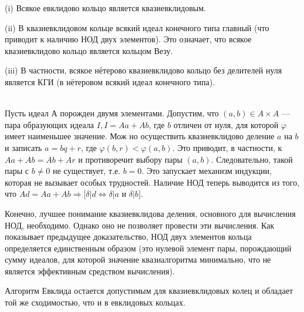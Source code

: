 \documentclass{mai_book}
\begin{document}
\begin{predl}
\hspace*{0.5cm}
(i) Всякое евклидово кольцо является квазиевклидовым.

(ii) В квазиевклидовом кольце всякий идеал конечного типа главный (что приводит к наличию НОД двух элементов). Это означает, что всякое квазиевклидово кольцо является кольцом Везу.

(iii) В частности, всякое нётерово квазиевклидово кольцо без дели­телей нуля является КГИ (в нётеровом всякий идеал конечного типа).
\end{predl}
\begin{myproof}
\\
Пусть идеал $А$ порожден двумя элементами. Допустим, что
$(a, b)\in A \times A$ — пара образующих идеала $I, I = Aa + Ab$, где $b$
отличен от нуля, для которой $\varphi$ имеет наименьшее значение. Мож­
но осуществить квазиевклидово деление $a$ на $b$ и записать $a=bq+r$,
где $\varphi(b,r) < \varphi(a, b)$. Это приводит, в частности, к $Aa+Ab=Ab+Ar$
и противоречит выбору пары $(a,b)$. Следовательно, такой пары с
$b\neq0$ не существует, т.е. $b=0$. Это запускает механизм индукции,
которая не вызывает особых трудностей. Наличие НОД теперь выводится из того, что $Ad = Aa + Ab \Rightarrow[\delta|d \Longleftrightarrow \delta|a$ и $\delta|b]$.
\end{myproof}
\newpage
\begin{mynotice}
Конечно, лучшее понимание квазиевклидова деления, основного для вычисления НОД, необходимо. Однако оно
не позволяет провести эти вычисления. Как показывает преды­дущее доказательство, НОД двух элементов кольца определяется
единственным образом (это нулевой элемент пары, порождающий
сумму идеалов, для которой значение квазиалгоритма минималь­но, что не является эффективным средством вычисления).\\
\end{mynotice}

Алгоритм Евклида остается допустимым для квазиевклидовых ко­лец и обладает той же сходимостью, что и в евклидовых кольцах.
\end{document}
